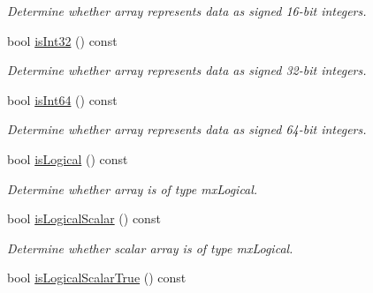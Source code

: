 \begin{DoxyCompactItemize}
\begin{DoxyCompactList}\small\item\em \-Determine whether array represents data as signed 16-\/bit integers. \end{DoxyCompactList}\item 
\hypertarget{class_mx_array_aeabe8b6c01a45d2ea49fb4d14e29d9f0}{bool \hyperlink{class_mx_array_aeabe8b6c01a45d2ea49fb4d14e29d9f0}{is\-Int32} () const }\label{class_mx_array_aeabe8b6c01a45d2ea49fb4d14e29d9f0}

\begin{DoxyCompactList}\small\item\em \-Determine whether array represents data as signed 32-\/bit integers. \end{DoxyCompactList}\item 
\hypertarget{class_mx_array_a1c720da4fe0328e4d5582ce61d2de50e}{bool \hyperlink{class_mx_array_a1c720da4fe0328e4d5582ce61d2de50e}{is\-Int64} () const }\label{class_mx_array_a1c720da4fe0328e4d5582ce61d2de50e}

\begin{DoxyCompactList}\small\item\em \-Determine whether array represents data as signed 64-\/bit integers. \end{DoxyCompactList}\item 
\hypertarget{class_mx_array_ae8f8917f83ee5af509ea2032b05b0c89}{bool \hyperlink{class_mx_array_ae8f8917f83ee5af509ea2032b05b0c89}{is\-Logical} () const }\label{class_mx_array_ae8f8917f83ee5af509ea2032b05b0c89}

\begin{DoxyCompactList}\small\item\em \-Determine whether array is of type mx\-Logical. \end{DoxyCompactList}\item 
\hypertarget{class_mx_array_a0a32db21adc2c5c92518183a75932a80}{bool \hyperlink{class_mx_array_a0a32db21adc2c5c92518183a75932a80}{is\-Logical\-Scalar} () const }\label{class_mx_array_a0a32db21adc2c5c92518183a75932a80}

\begin{DoxyCompactList}\small\item\em \-Determine whether scalar array is of type mx\-Logical. \end{DoxyCompactList}\item 
\hypertarget{class_mx_array_aa30ae1c09e11422eea2074966de21411}{bool \hyperlink{class_mx_array_aa30ae1c09e11422eea2074966de21411}{is\-Logical\-Scalar\-True} () const }\label{class_mx_array_aa30ae1c09e11422eea2074966de21411}


\end{DoxyCompactItemize}
